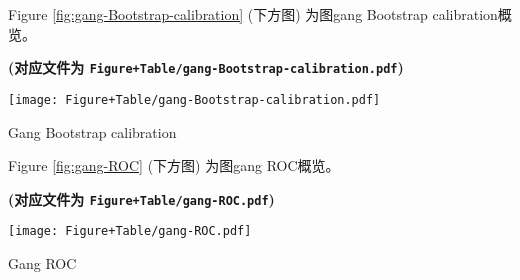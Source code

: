 \documentclass[
]{article}
\begin{document}
Figure \ref{fig:gang-Bootstrap-calibration} (下方图) 为图gang Bootstrap calibration概览。

\textbf{(对应文件为 \texttt{Figure+Table/gang-Bootstrap-calibration.pdf})}

\def\@captype{figure}
\begin{center}
\texttt{[image: Figure+Table/gang-Bootstrap-calibration.pdf]}
\caption{Gang Bootstrap calibration}\label{fig:gang-Bootstrap-calibration}
\end{center}

Figure \ref{fig:gang-ROC} (下方图) 为图gang ROC概览。

\textbf{(对应文件为 \texttt{Figure+Table/gang-ROC.pdf})}

\def\@captype{figure}
\begin{center}
\texttt{[image: Figure+Table/gang-ROC.pdf]}
\caption{Gang ROC}\label{fig:gang-ROC}
\end{center}
\end{document}
